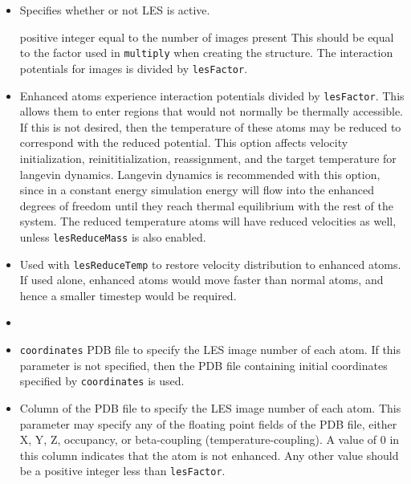 \begin{itemize}

\item
{}
{Specifies whether or not LES is active.}

{positive integer equal to the number of images present}
{This should be equal to the factor used in {\tt multiply}
 when creating the structure.  The interaction potentials for images is
 divided by {\tt lesFactor}.  
}

\item
{}
{Enhanced atoms experience interaction potentials divided by {\tt lesFactor}.
This allows them to enter regions that would not normally be thermally
accessible.  If this is not desired, then the temperature of these atoms
may be reduced to correspond with the reduced potential.  This option
affects velocity initialization, reinititialization, reassignment, and
the target temperature for langevin dynamics.  Langevin dynamics is
recommended with this option, since in a constant energy simulation energy
will flow into the enhanced degrees of freedom until they reach thermal
equilibrium with the rest of the system.  The reduced temperature atoms
will have reduced velocities as well, unless {\tt lesReduceMass} is also
enabled.}

\item
{}
{Used with {\tt lesReduceTemp} to restore velocity distribution to
enhanced atoms.  If used alone, enhanced atoms would move faster than
normal atoms, and hence a smaller timestep would be required.}

\item
\item
{} {{\tt coordinates}}
{PDB file to specify the LES image number of each atom.
If this parameter is not specified, then 
the PDB file containing initial coordinates specified by 
{\tt coordinates} is used.}

\item
{}
{Column of the PDB file to specify the LES image number of each atom.
This parameter may specify any of the floating point fields of the PDB file, 
either X, Y, Z, occupancy, or beta-coupling (temperature-coupling).  
A value of 0 in this column indicates that the atom is not enhanced.
Any other value should be a positive integer less than {\tt lesFactor}.}

\end{itemize}

